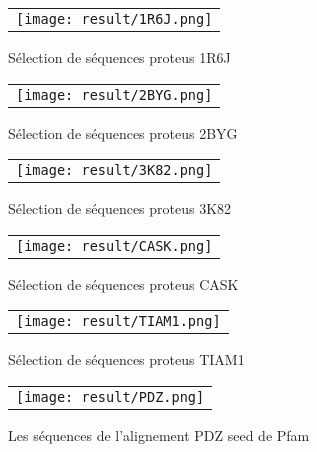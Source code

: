    \begin{figure}[t]
     \centering
     \begin{tabular}{c}
       \texttt{[image: result/1R6J.png]} \\
     \end{tabular}
     \caption{Sélection de séquences proteus 1R6J }
\label{result:1R6J}
   \end{figure}

    \clearpage

   \begin{figure}[t]
     \centering
     \begin{tabular}{c}
       \texttt{[image: result/2BYG.png]} \\
     \end{tabular}
     \caption{Sélection de séquences proteus 2BYG }
\label{result:2BYG}
   \end{figure}

   \begin{figure}[t]
     \centering
     \begin{tabular}{c}
       \texttt{[image: result/3K82.png]} \\
     \end{tabular}
     \caption{Sélection de séquences proteus 3K82 }
\label{result:3K82}
   \end{figure}

    \clearpage

   \begin{figure}[t]
     \centering
     \begin{tabular}{c}
       \texttt{[image: result/CASK.png]} \\
     \end{tabular}
     \caption{Sélection de séquences proteus CASK }
\label{result:CASK}
   \end{figure}

   \begin{figure}[t]
     \centering
     \begin{tabular}{c}
       \texttt{[image: result/TIAM1.png]} \\
     \end{tabular}
     \caption{Sélection de séquences proteus TIAM1 }
\label{result:TIAM1}
   \end{figure}

    \clearpage


   \begin{figure}[t]
     \centering
     \begin{tabular}{c}
       \texttt{[image: result/PDZ.png]} \\
     \end{tabular}
     \caption{Les séquences de l'alignement PDZ seed de Pfam}
\label{result:PDZ_seed}
   \end{figure}

